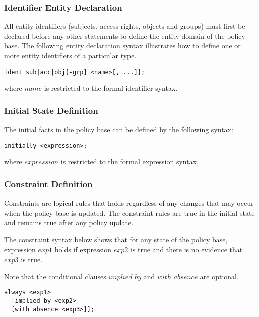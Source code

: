 \documentclass[10pt, twocolumn]{article}
\begin{document}
      \subsubsection{Identifier Entity Declaration}

        All entity identifiers (subjects, access-rights, objects and groups)
        must first be declared before any other statements to define the
        entity domain of the policy base. The following entity declaration
        syntax illustrates how to define one or more entity identifiers of a
        particular type.

        \begin{verbatim}ident sub|acc|obj[-grp] <name>[, ...]];\end{verbatim}

        where $name$ is restricted to the formal identifier syntax.

      \subsubsection{Initial State Definition}

        The initial facts in the policy base can be defined by the following
        syntax:

        \begin{verbatim}initially <expression>;\end{verbatim}

        where $expression$ is restricted to the formal expression syntax.

      \subsubsection{Constraint Definition}

        Constraints are logical rules that holds regardless of any changes
        that may occur when the policy base is updated. The constraint rules
        are true in the initial state and remains true after any policy update.

        The constraint syntax below shows that for any state of the policy
        base, expression $exp1$ holds if expression $exp2$ is true and there
        is no evidence that $exp3$ is true.

        Note that the conditional clauses $implied$ $by$ and $with$ $absence$
        are optional.

\begin{verbatim}
always <exp1>
  [implied by <exp2>
  [with absence <exp3>]];
\end{verbatim}
\end{document}
